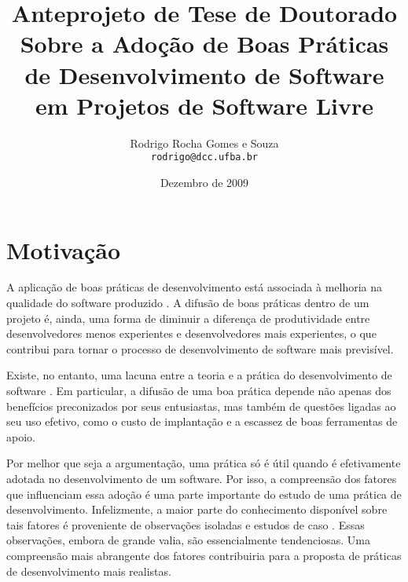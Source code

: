 \documentclass{article}
\title{
{\small Anteprojeto de Tese de Doutorado}
\\
Sobre a Adoção de Boas Práticas 
de Desenvolvimento de Software 
em Projetos de Software Livre
%
}
\author{Rodrigo Rocha Gomes e Souza\\
\texttt{rodrigo@dcc.ufba.br}
}
\date{Dezembro de 2009}
\begin{document}
\sloppy
\maketitle




\section{Motivação} %

A aplicação de boas práticas de desenvolvimento está associada à melhoria na
qualidade do software produzido \cite{grady1993}. A difusão de boas práticas
dentro de um projeto é, ainda, uma forma de diminuir a diferença de
produtividade entre desenvolvedores menos experientes e desenvolvedores mais
experientes, o que contribui para tornar o processo de desenvolvimento de
software mais previsível.

Existe, no entanto, uma lacuna entre a teoria e a prática do desenvolvimento de
software \cite{glass1996}. Em particular, a difusão de uma boa prática depende
não apenas dos benefícios preconizados por seus entusiastas, mas também de
questões ligadas ao seu uso efetivo, como o custo de implantação e a escassez de
boas ferramentas de apoio. 

Por melhor que seja a argumentação, uma prática só é útil quando é efetivamente
adotada no desenvolvimento de um software. Por isso, a compreensão dos fatores
que influenciam essa adoção é uma parte importante do estudo de uma prática de
desenvolvimento. Infelizmente, a maior parte do conhecimento disponível sobre
tais fatores é proveniente de observações isoladas e estudos de caso
\cite{crowston2005}. Essas observações, embora de grande valia, são
essencialmente tendenciosas. Uma compreensão mais abrangente dos fatores
contribuiria para a proposta de práticas de desenvolvimento mais realistas.
\end{document}
